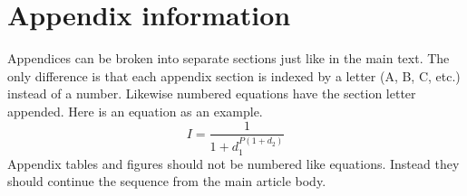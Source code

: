 \documentclass[linenumbers,trackchanges]{aastex701}
\begin{document}
%



\appendix

\section{Appendix information}

Appendices can be broken into separate sections just like in the main text.
The only difference is that each appendix section is indexed by a letter
(A, B, C, etc.) instead of a number.  Likewise numbered equations have
the section letter appended.  Here is an equation as an example.
\begin{equation}
I = \frac{1}{1 + d_{1}^{P (1 + d_{2} )}}
\end{equation}
Appendix tables and figures should not be numbered like equations. Instead
they should continue the sequence from the main article body.
\end{document}

